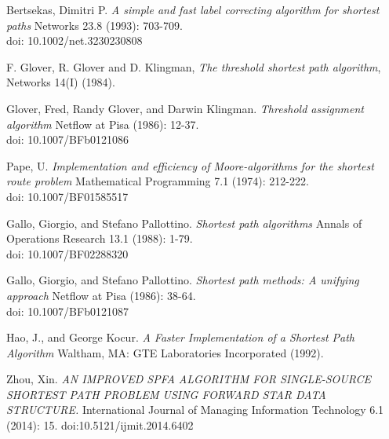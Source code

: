 \documentclass{article}
\begin{document}
\begin{thebibliography}{9}
Bertsekas, Dimitri P. \textit{A simple and fast label correcting algorithm for shortest paths} Networks 23.8 (1993): 703-709.\\
doi: 10.1002/net.3230230808

F. Glover, R. Glover and D. Klingman, \textit{The threshold shortest path algorithm}, Networks 14(I)
(1984). 

Glover, Fred, Randy Glover, and Darwin Klingman. \textit{Threshold assignment algorithm} Netflow at Pisa (1986): 12-37.\\
doi: 10.1007/BFb0121086

Pape, U. \textit{Implementation and efficiency of Moore-algorithms for the shortest route problem} Mathematical Programming 7.1 (1974): 212-222.\\
doi: 10.1007/BF01585517

Gallo, Giorgio, and Stefano Pallottino. \textit{Shortest path algorithms} Annals of Operations Research 13.1 (1988): 1-79.\\
doi: 10.1007/BF02288320

Gallo, Giorgio, and Stefano Pallottino. \textit{Shortest path methods: A unifying approach} Netflow at Pisa (1986): 38-64.\\
doi: 10.1007/BFb0121087

Hao, J., and George Kocur. \textit{A Faster Implementation of a Shortest Path Algorithm} Waltham, MA: GTE Laboratories Incorporated (1992).

Zhou, Xin. \textit{AN IMPROVED SPFA ALGORITHM FOR SINGLE-SOURCE SHORTEST PATH PROBLEM USING FORWARD STAR DATA STRUCTURE.} International Journal of Managing Information Technology 6.1 (2014): 15.
doi:10.5121/ijmit.2014.6402

\end{thebibliography}
\end{document}
